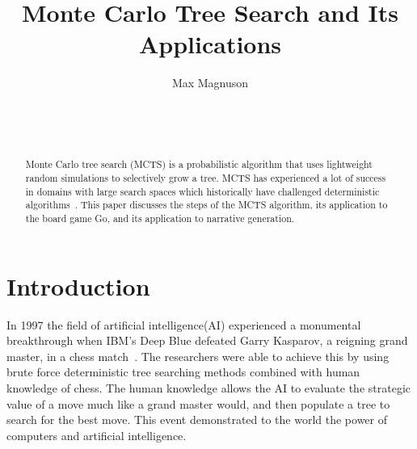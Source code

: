 \documentclass{sig-alternate}
\begin{document}

\title{Monte Carlo Tree Search and Its Applications}


\author{
\alignauthor
Max Magnuson\\
	\\
	\\
	\\
}

\maketitle
\begin{abstract}
Monte Carlo tree search (MCTS) is a probabilistic algorithm that uses lightweight random simulations to selectively grow a tree. MCTS has experienced a lot of success in domains with large search spaces which historically have challenged deterministic algorithms~\cite{RAVEinGo}. This paper discusses the steps of the MCTS algorithm, its application to the board game Go, and its application to narrative generation. 
\end{abstract}


\section{Introduction} 
In 1997 the field of artificial intelligence(AI) experienced a monumental breakthrough when IBM's Deep Blue defeated Garry Kasparov, a reigning grand master, in a chess match~\cite{TheGrandChallenge}. The researchers were able to achieve this by using brute force deterministic tree searching methods combined with human knowledge of chess. The human knowledge allows the AI to evaluate the strategic value of a move much like a grand master would, and then populate a tree to search for the best move. This event demonstrated to the world the power of computers and artificial intelligence. 
\end{document}
